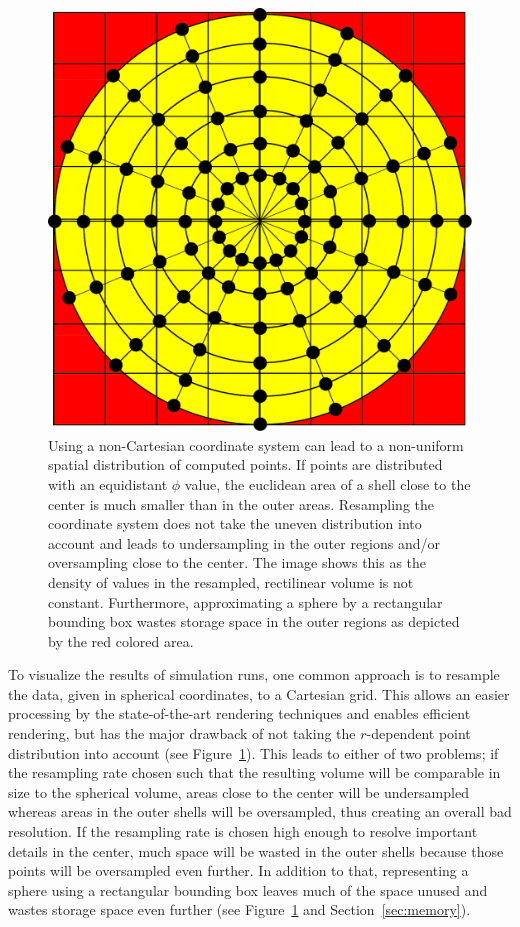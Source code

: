 \documentclass{egpubl}
\begin{document}
\begin{figure}
	\centering
	\includegraphics[width=0.75\columnwidth]{figures/spherical_resampling.pdf}
	\caption{Using a non-Cartesian coordinate system can lead to a non-uniform spatial distribution of computed points. If points are distributed with an equidistant $\phi$ value, the euclidean area of a shell close to the center is much smaller than in the outer areas. Resampling the coordinate system does not take the uneven distribution into account and leads to undersampling in the outer regions and/or oversampling close to the center. The image shows this as the density of values in the resampled, rectilinear volume is not constant. Furthermore, approximating a sphere by a rectangular bounding box wastes storage space in the outer regions as depicted by the red colored area.}
	\label{fig:resamplingerror}
\end{figure}

To visualize the results of simulation runs, one common approach is to resample the data, given in spherical coordinates, to a Cartesian grid. This allows an easier processing by the state-of-the-art rendering techniques and enables efficient rendering, but has the major drawback of not taking the $r$-dependent point distribution into account (see Figure~\ref{fig:resamplingerror}). This leads to either of two problems; if the resampling rate chosen such that the resulting volume will be comparable in size to the spherical volume, areas close to the center will be undersampled whereas areas in the outer shells will be oversampled, thus creating an overall bad resolution. If the resampling rate is chosen high enough to resolve important details in the center, much space will be wasted in the outer shells because those points will be oversampled even further. In addition to that, representing a sphere using a rectangular bounding box leaves much of the space unused and wastes storage space even further (see Figure~\ref{fig:resamplingerror} and Section~\ref{sec:memory}).
\end{document}
